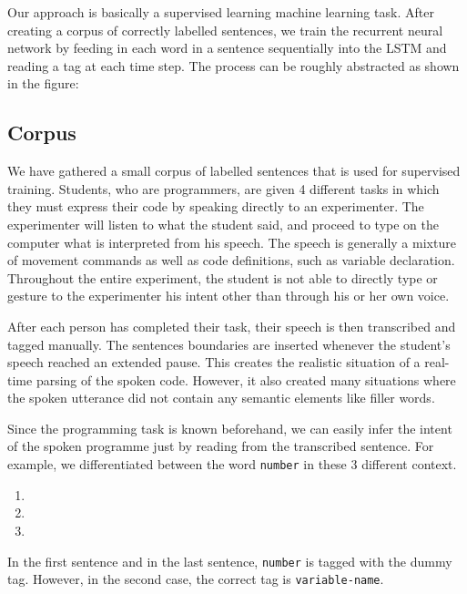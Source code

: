 \documentclass[fyp]{socreport}
\begin{document}
Our approach is basically a supervised learning machine learning task. After
creating a corpus of correctly labelled sentences, we train the recurrent
neural network by feeding in each word in a sentence sequentially into the LSTM
and reading a tag at each time step. The process can be roughly abstracted as
shown in the figure:


\subsection{Corpus}
We have gathered a small corpus of labelled sentences that is used for
supervised training. Students, who are programmers, are given 4 different tasks
in which they must express their code by speaking directly to an experimenter.
The experimenter will listen to what the student said, and proceed to type on
the computer what is interpreted from his speech. The speech is generally a mixture
of movement commands as well as code definitions, such as variable declaration.
Throughout the entire experiment, the student is not able to directly type or
gesture to the experimenter his intent other than through his or her own voice.

After each person has completed their task, their speech is then transcribed
and tagged manually. The sentences boundaries are inserted whenever the student's
speech reached an extended pause. This creates the realistic situation of
a real-time parsing of the spoken code. However, it also created many situations
where the spoken utterance did not contain any semantic elements like filler
words.

Since the programming task is known beforehand, we can easily infer the intent
of the spoken programme just by reading from the transcribed sentence. For example,
we differentiated between the word \texttt{number} in these 3 different context.

\begin{enumerate}
\itemsep0em
  \item {}    
  \item {}   
      
  \item {}    
\end{enumerate}

In the first sentence and in the last sentence, \texttt{number} is tagged
with the dummy tag. However, in the second case, the correct tag is
\texttt{variable-name}.
\end{document}
